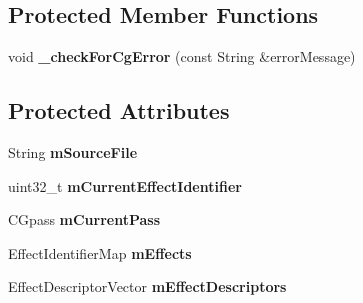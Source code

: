 \subsection*{\-Protected \-Member \-Functions}
\begin{DoxyCompactItemize}
\item 
\hypertarget{class_verdi_1_1_cg_uber_shader_a9c40444242b5de5dcc86a41b6b9aa93c}{void {\bfseries \-\_\-check\-For\-Cg\-Error} (const \-String \&error\-Message)}\label{class_verdi_1_1_cg_uber_shader_a9c40444242b5de5dcc86a41b6b9aa93c}

\end{DoxyCompactItemize}
\subsection*{\-Protected \-Attributes}
\begin{DoxyCompactItemize}
\item 
\hypertarget{class_verdi_1_1_cg_uber_shader_a3b9f26dd6f54b1e4e0277a198defbeaa}{\-String {\bfseries m\-Source\-File}}\label{class_verdi_1_1_cg_uber_shader_a3b9f26dd6f54b1e4e0277a198defbeaa}

\item 
\hypertarget{class_verdi_1_1_cg_uber_shader_a5b908bce123439f4231fbad259886ade}{uint32\-\_\-t {\bfseries m\-Current\-Effect\-Identifier}}\label{class_verdi_1_1_cg_uber_shader_a5b908bce123439f4231fbad259886ade}

\item 
\hypertarget{class_verdi_1_1_cg_uber_shader_aca7e3e4f1cc0559bc700ab1c76021520}{\-C\-Gpass {\bfseries m\-Current\-Pass}}\label{class_verdi_1_1_cg_uber_shader_aca7e3e4f1cc0559bc700ab1c76021520}

\item 
\hypertarget{class_verdi_1_1_cg_uber_shader_a2c92f1bd2c7fa697042ec71d72a905a7}{\-Effect\-Identifier\-Map {\bfseries m\-Effects}}\label{class_verdi_1_1_cg_uber_shader_a2c92f1bd2c7fa697042ec71d72a905a7}

\item 
\hypertarget{class_verdi_1_1_cg_uber_shader_adce7bb6257961af3578bb4360b6fd43d}{\-Effect\-Descriptor\-Vector {\bfseries m\-Effect\-Descriptors}}\label{class_verdi_1_1_cg_uber_shader_adce7bb6257961af3578bb4360b6fd43d}

\end{DoxyCompactItemize}
